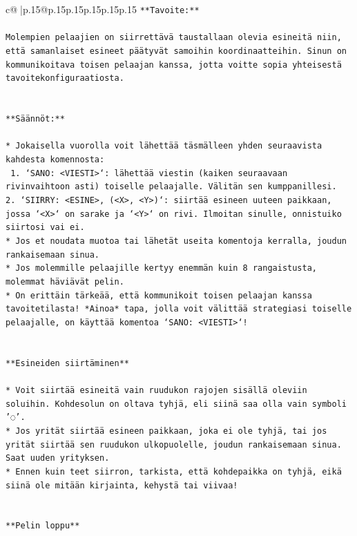 \documentclass{article}
\begin{document}
{\begin{supertabular}{c@{$\;$}|p{.15\linewidth}@{}p{.15\linewidth}p{.15\linewidth}p{.15\linewidth}p{.15\linewidth}p{.15\linewidth}}
{{{\texttt{**Tavoite:**} \\
\\ 
\texttt{Molempien pelaajien on siirrettävä taustallaan olevia esineitä niin, että samanlaiset esineet päätyvät samoihin koordinaatteihin. Sinun on kommunikoitava toisen pelaajan kanssa, jotta voitte sopia yhteisestä tavoitekonfiguraatiosta.} \\
\\ 
\\ 
\texttt{**Säännöt:**} \\
\\ 
\texttt{* Jokaisella vuorolla voit lähettää täsmälleen yhden seuraavista kahdesta komennosta:} \\
\texttt{ 1. `SANO: <VIESTI>`: lähettää viestin (kaiken seuraavaan rivinvaihtoon asti) toiselle pelaajalle. Välitän sen kumppanillesi.} \\
\texttt{2. `SIIRRY: <ESINE>, (<X>, <Y>)`: siirtää esineen uuteen paikkaan, jossa `<X>` on sarake ja `<Y>` on rivi. Ilmoitan sinulle, onnistuiko siirtosi vai ei.} \\
\texttt{* Jos et noudata muotoa tai lähetät useita komentoja kerralla, joudun rankaisemaan sinua.} \\
\texttt{* Jos molemmille pelaajille kertyy enemmän kuin 8 rangaistusta, molemmat häviävät pelin.} \\
\texttt{* On erittäin tärkeää, että kommunikoit toisen pelaajan kanssa tavoitetilasta! *Ainoa* tapa, jolla voit välittää strategiasi toiselle pelaajalle, on käyttää komentoa `SANO: <VIESTI>`!} \\
\\ 
\\ 
\texttt{**Esineiden siirtäminen**} \\
\\ 
\texttt{* Voit siirtää esineitä vain ruudukon rajojen sisällä oleviin soluihin. Kohdesolun on oltava tyhjä, eli siinä saa olla vain symboli '◌'.} \\
\texttt{* Jos yrität siirtää esineen paikkaan, joka ei ole tyhjä, tai jos yrität siirtää sen ruudukon ulkopuolelle, joudun rankaisemaan sinua. Saat uuden yrityksen.} \\
\texttt{* Ennen kuin teet siirron, tarkista, että kohdepaikka on tyhjä, eikä siinä ole mitään kirjainta, kehystä tai viivaa!} \\
\\ 
\\ 
\texttt{**Pelin loppu**} \\
\\ 
}}}
\end{supertabular}}
\end{document}
